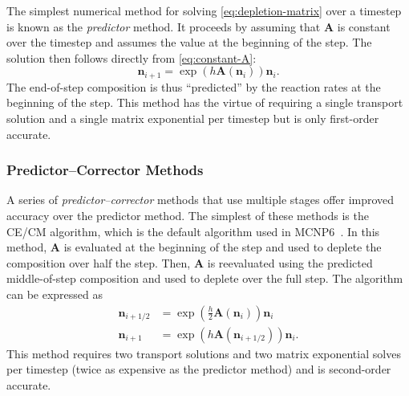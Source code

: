 \documentclass[3p,authoryear]{elsarticle}
\newcommand{\vect}[1]{\mathbf{#1}} %
\begin{document}
The simplest numerical method for solving \cref{eq:depletion-matrix} over a
timestep is known as the \emph{predictor} method. It proceeds by assuming that
$\vect{A}$ is constant over the timestep and assumes the value at the
beginning of the step. The solution then follows directly from
\cref{eq:constant-A}:
\begin{equation}
  \label{eq:predictor}
  \vect{n}_{i+1} = \exp\left(h\vect{A}(\vect{n}_i) \right) \vect{n}_i.
\end{equation}
The end-of-step composition is thus ``predicted'' by the reaction rates at the
beginning of the step. This method has the virtue of requiring a single
transport solution and a single matrix exponential per timestep but is only
first-order accurate.

\subsubsection{Predictor--Corrector Methods}

A series of \emph{predictor--corrector} methods that use multiple stages offer
improved accuracy over the predictor method. The simplest of these methods is
the CE/CM algorithm, which is the default algorithm used in
MCNP6~\citep{fensin2006tans}. In this method, $\vect{A}$ is evaluated at the
beginning of the step and used to deplete the composition over half the step.
Then, $\vect{A}$ is reevaluated using the predicted middle-of-step composition
and used to deplete over the full step. The algorithm can be expressed as
\begin{equation}
  \begin{split}
    \vect{n}_{i+1/2} &= \exp \left (\frac{h}{2}\vect{A}(\vect{n}_i) \right) \vect{n}_i \\
    \vect{n}_{i+1} &= \exp \left(h \vect{A}(\vect{n}_{i+1/2}) \right) \vect{n}_i.
  \end{split}
\end{equation}
This method requires two transport solutions and two matrix exponential solves
per timestep (twice as expensive as the predictor method) and is second-order
accurate.
\end{document}
